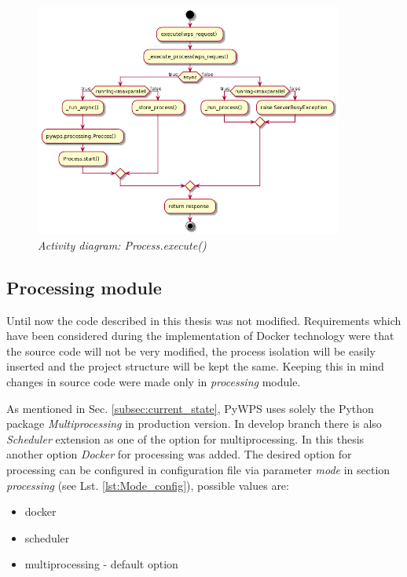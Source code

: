 \documentclass[12pt,a4paper]{article}
\begin{document}
\begin{figure}[h!]
\centering
\includegraphics[width=0.9\textwidth]{img/Diag_process_execute.png}
\caption{\textit{Activity diagram: Process.execute()}}
\label{fig:Diag_process_execute}
\end{figure}

\subsection{Processing module}
Until now the code described in this thesis was not modified. Requirements which have been considered during the implementation of
Docker technology were that the source code will not be very modified, the process isolation will be easily inserted and the project structure will be kept the same. Keeping this in mind changes in source code were made only in \textit{processing} module.

As mentioned in Sec. \ref{subsec:current_state}, PyWPS uses solely the Python package \textit{Multiprocessing} in production version.
In develop branch there is also \textit{Scheduler} extension as one of the option for multiprocessing. In this thesis another option 
\textit{Docker} for processing was added. The desired option for processing can be configured in configuration file via parameter \textit{mode} in section \textit{processing} (see Lst. \ref{lst:Mode_config}), possible values are:
\begin{itemize}
\item docker
\item scheduler
\item multiprocessing - default option
\end{itemize}
\end{document}
